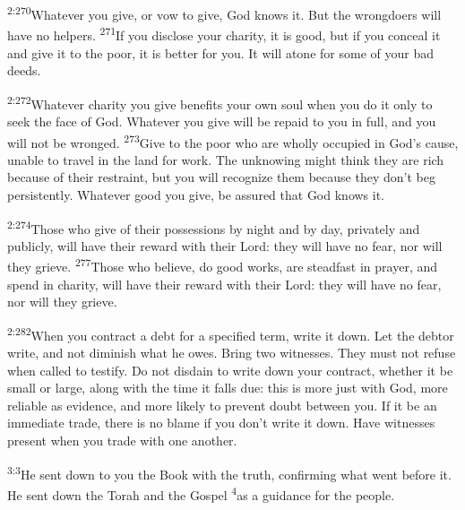 \documentclass[openany,12pt,english]{book}
\newenvironment{para}{\par\pretolerance=100\tolerance=200\setlength{\emergencystretch}{0.6em}\relax}{\par}
\begin{document}
\begin{para}
    \textsuperscript{2:270}\thinspace{}What\-ev\-er you give, or vow to give, God knows it. But the wrongdoers will have no helpers.
    \textsuperscript{271}\thinspace{}If you dis\-close your char\-i\-ty, it is good, but if you con\-ceal it and give it to the poor, it is bet\-ter for you. It will a\-tone for some of your bad deeds.
\end{para}

\begin{para}
    \textsuperscript{2:272}\thinspace{}What\-ev\-er char\-i\-ty you give benefits your own soul when you do it on\-ly to seek the face of God. What\-ev\-er you give will be repaid to you in full, and you will not be wronged.
    \textsuperscript{273}\thinspace{}Give to the poor who are whol\-ly occupied in God's cause, un\-a\-ble to trav\-el in the land for work. The un\-know\-ing might think they are rich be\-cause of their re\-straint, but you will rec\-og\-nize them be\-cause they don't beg per\-sist\-ent\-ly. What\-ev\-er good you give, be as\-sured that God knows it.
\end{para}

\begin{para}
    \textsuperscript{2:274}\thinspace{}Those who give of their possessions by night and by day, pri\-vate\-ly and pub\-lic\-ly, will have their re\-ward with their Lord: they will have no fear, nor will they grieve.
    \textsuperscript{277}\thinspace{}Those who be\-lieve, do good works, are stead\-fast in pray\-er, and spend in char\-i\-ty, will have their re\-ward with their Lord: they will have no fear, nor will they grieve.
\end{para}

\begin{para}
    \textsuperscript{2:282}\thinspace{}When you con\-tract a debt for a spec\-i\-fied term, write it down. Let the debt\-or write, and not di\-min\-ish what he owes. Bring two witnesses. They must not ref\-use when called to tes\-ti\-fy. Do not dis\-dain to write down your con\-tract, wheth\-er it be small or large, a\-long with the time it falls due: this is more just with God, more re\-li\-a\-ble as ev\-i\-dence, and more like\-ly to pre\-vent doubt be\-tween you. If it be an im\-me\-di\-ate trade, there is no blame if you don't write it down. Have witnesses pres\-ent when you trade with one an\-oth\-er.
\end{para}

\bigskip{}

\begin{para}
    \textsuperscript{3:3}\thinspace{}He sent down to you the Book with the truth, confirming what went be\-fore it. He sent down the Torah and the Gos\-pel
    \textsuperscript{4}\thinspace{}as a guid\-ance for the peo\-ple.
\end{para}
\end{document}
